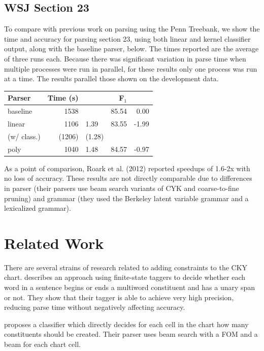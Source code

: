\documentclass[11pt]{article}
\begin{document}
\subsection{WSJ Section 23}
\label{sec-5-5}

To compare with previous work on parsing using the Penn Treebank, we show the
time and accuracy for parsing section 23, using both linear and kernel
classifier output, along with the baseline parser, below. The times reported are
the average of three runs each. Because there was significant variation in parse
time when multiple processes were run in parallel, for these results only one
process was run at a time. The results parallel those shown on the development
data.

\begin{center}
\begin{tabular}{lrlrr}
Parser & Time (s) &  & F$_{\text{1}}$ & \\
\hline
baseline & 1538 &  & 85.54 & 0.00\\
linear & 1106 & 1.39\texttimes{} & 83.55 & -1.99\\
(w/ class.) & (1206) & (1.28\texttimes{}) &  & \\
poly & 1040 & 1.48\texttimes{} & 84.57 & -0.97\\
\end{tabular}
\end{center}

As a point of comparison, Roark et al. (2012) reported speedups of 1.6-2x with
no loss of accuracy. These results are not directly comparable due to
differences in parser (their parsers use beam search variants of CYK and
coarse-to-fine pruning) and grammar (they used the Berkeley latent variable
grammar and a lexicalized grammar).

\section{Related Work}
\label{sec-6}

There are several strains of research related to adding constraints to
the CKY chart. \cite{Roark2012} describes an approach using
finite-state taggers to decide whether each word in a sentence begins
or ends a multiword constituent and has a unary span or not. They show
that their tagger is able to achieve very high precision, reducing
parse time without negatively affecting accuracy.

\cite{Bodenstab2011} proposes a classifier which directly decides for
each cell in the chart how many constituents should be created. Their
parser uses beam search with a FOM and a beam for each chart cell.
\end{document}
